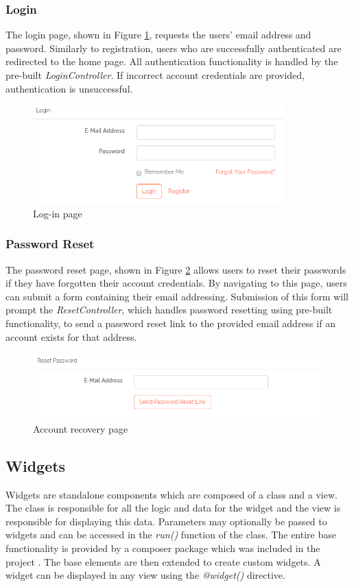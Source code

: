 \subsubsection{Login}
The login page, shown in Figure \ref{fig:LoginPage}, requests the users' email address and password. Similarly to registration, users who are successfully authenticated are redirected to the home page. All authentication functionality is handled by the pre-built \textit{LoginController}. If incorrect account credentials are provided, authentication is unsuccessful.

\begin{figure}[H]
\centering
\includegraphics[height=1.5in]{Images/Design/login-page}
\caption{Log-in page}
\label{fig:LoginPage}
\end{figure}

\subsubsection{Password Reset}
The password reset page, shown in Figure \ref{fig:PasswordReset} allows users to reset their passwords if they have forgotten their account credentials. By navigating to this page, users can submit a form containing their email addressing. Submission of this form will prompt the \textit{ResetController}, which handles password resetting using pre-built functionality, to send a password reset link to the provided email address if an account exists for that address.

\begin{figure}[H]
\centering
\includegraphics[height=1in]{Images/Implementation/PasswordReset}
\caption{Account recovery page}
\label{fig:PasswordReset}
\end{figure}

\subsection{Widgets}
Widgets are standalone components which are composed of a class and a view. The class is responsible for all the logic and data for the widget and the view is responsible for displaying this data. Parameters may optionally be passed to widgets and can be accessed in the \textit{run()} function of the class. The entire base functionality is provided by a composer package which was included in the project \cite{Packagist:LaravelWidgets}. The base elements are then extended to create custom widgets. A widget can be displayed in any view using the \textit{@widget()} directive.

